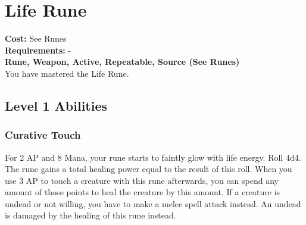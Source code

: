 \section{Life Rune}\label{rune:life}
\textbf{Cost:} See Runes\\
\textbf{Requirements:} -\\
\textbf{Rune, Weapon, Active, Repeatable, Source (See Runes)}\\
You have mastered the Life Rune.

\subsection{Level 1 Abilities}

\subsubsection{Curative Touch}
For 2 AP and 8 Mana, your rune starts to faintly glow with life energy.
Roll 4d4.
The rune gains a total healing power equal to the result of this roll.
When you use 3 AP to touch a creature with this rune afterwards, you can spend any amount of those points to heal the creature by this amount.
If a creature is undead or not willing, you have to make a melee spell attack instead.
An undead is damaged by the healing of this rune instead.